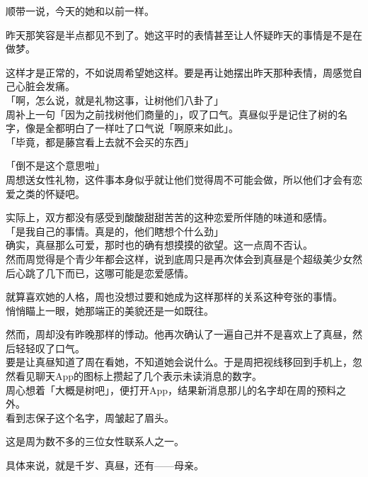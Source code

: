 顺带一说，今天的她和以前一样。

昨天那笑容是半点都见不到了。她这平时的表情甚至让人怀疑昨天的事情是不是在做梦。

这样才是正常的，不如说周希望她这样。要是再让她摆出昨天那种表情，周感觉自己心脏会发痛。\\

「啊，怎么说，就是礼物这事，让树他们八卦了」\\

周补上一句「因为之前找树他们商量的」，叹了口气。真昼似乎是记住了树的名字，像是全都明白了一样吐了口气说「啊原来如此」。\\

「毕竟，都是藤宫看上去就不会买的东西」

「倒不是这个意思啦」\\

周想送女性礼物，这件事本身似乎就让他们觉得周不可能会做，所以他们才会有恋爱之类的怀疑吧。

实际上，双方都没有感受到酸酸甜甜苦苦的这种恋爱所伴随的味道和感情。\\

「是我自己的事情。真是的，他们瞎想个什么劲」\\

确实，真昼那么可爱，那时也的确有想摸摸的欲望。这一点周不否认。\\

然而周觉得是个青少年都会这样，说到底周只是再次体会到真昼是个超级美少女然后心跳了几下而已，这哪可能是恋爱感情。

就算喜欢她的人格，周也没想过要和她成为这样那样的关系这种夸张的事情。\\

悄悄瞄上一眼，她那端正的美貌还是一如既往。

然而，周却没有昨晚那样的悸动。他再次确认了一遍自己并不是喜欢上了真昼，然后轻轻叹了口气。\\

要是让真昼知道了周在看她，不知道她会说什么。于是周把视线移回到手机上，忽然看见聊天App的图标上攒起了几个表示未读消息的数字。\\

周心想着「大概是树吧」，便打开App，结果新消息那儿的名字却在周的预料之外。\\

看到志保子这个名字，周皱起了眉头。

这是周为数不多的三位女性联系人之一。

具体来说，就是千岁、真昼，还有——母亲。\\

